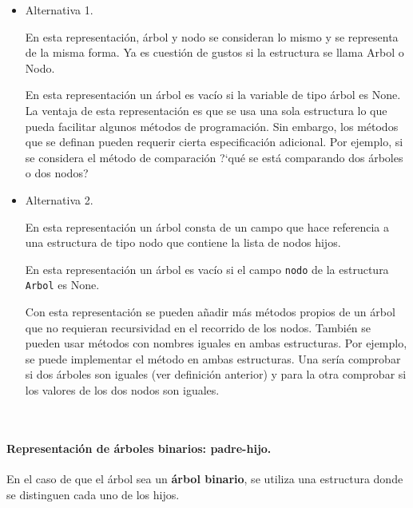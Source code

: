 


\begin{itemize}

\item Alternativa 1.

En esta representación, árbol y nodo se consideran lo mismo y se representa de la misma forma.
Ya es cuestión de gustos si la estructura se llama Arbol o Nodo.

En esta representación un árbol es vacío si la variable de tipo árbol es None.
La ventaja de esta representación es que se usa una sola estructura lo que pueda facilitar algunos métodos de programación. Sin embargo, los métodos que se definan pueden requerir cierta especificación adicional. Por ejemplo, si se considera el método de comparación   ?`qué se está comparando dos árboles o dos nodos?




\item Alternativa 2.

En esta representación  un árbol consta de un campo que hace referencia a una estructura de tipo nodo que contiene la lista de nodos hijos.


En esta representación un árbol es vacío si el campo {\tt nodo} de la estructura {\tt Arbol} es None.

Con esta representación se pueden añadir más métodos propios de un árbol que no requieran recursividad en el recorrido de los nodos. También se pueden usar métodos con nombres iguales en ambas estructuras. Por ejemplo, se puede implementar el método  en ambas estructuras. Una sería comprobar si dos árboles son iguales (ver definición anterior) y para la otra comprobar si los valores de los dos nodos son iguales.
\end{itemize}

\


\paragraph{Representación de árboles binarios: padre-hijo.}
En el caso de que el árbol sea un \textbf{árbol binario}, se utiliza una estructura donde se distinguen cada uno de los hijos.

